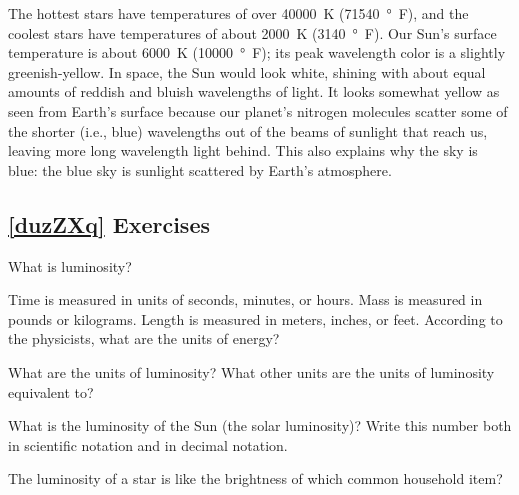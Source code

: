 \documentclass{article}
\numberwithin{equation}{section}
\numberwithin{figure}{section}
\begin{document}
The hottest stars have temperatures of over \SI{40000}{K} (\SI{71540}{\degree F}), and the coolest stars have temperatures of about \SI{2000}{K} (\SI{3140}{\degree F}). Our Sun's surface temperature is about \SI{6000}{K} (\SI{10000}{\degree F}); its peak wavelength color is a slightly greenish-yellow. In space, the Sun would look white, shining with about equal amounts of reddish and bluish wavelengths of light. It looks somewhat yellow as seen from Earth's surface because our planet's nitrogen molecules scatter some of the shorter (i.e., blue) wavelengths out of the beams of sunlight that reach us, leaving more long wavelength light behind. This also explains why the sky is blue: the blue sky is sunlight scattered by Earth's atmosphere.


\subsection*{\ref{duzZXq} Exercises}

\begin{exercise}
    What is luminosity?
\end{exercise}

\begin{exercise}
    Time is measured in units of seconds, minutes, or hours. Mass is measured in pounds or kilograms. Length is measured in meters, inches, or feet. According to the physicists, what are the units of energy?
\end{exercise}

\begin{exercise}
    What are the units of luminosity? What other units are the units of luminosity equivalent to?
\end{exercise}

\begin{exercise}
    What is the luminosity of the Sun (the solar luminosity)? Write this number both in scientific notation and in decimal notation.
\end{exercise}

\begin{exercise}
    The luminosity of a star is like the brightness of which common household item?
\end{exercise}
\end{document}
